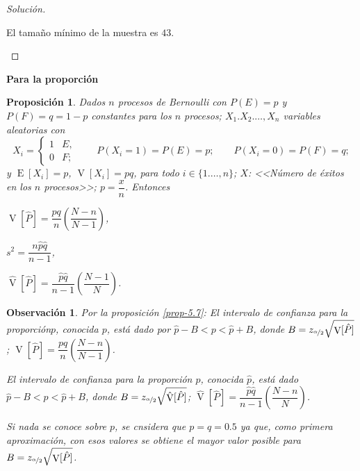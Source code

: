 \documentclass[a5paper,doc,10pt,noapacite]{apa6}
\DeclareMathOperator{\Esp}{E}
\DeclareMathOperator{\Var}{V}
\newtheorem{proposicion}{Proposición}
\newtheorem{observ}{Observación}
\newcommand{\neodefi}[1]{%
	\vspace{1\baselineskip}
	\textbf{\small#1} \newline
}
\begin{document}
{{\begin{proof}[Solución]
\begin{APAenumerate}
	
	El tamaño mínimo de la muestra es \(43\).			\qedhere
	\end{APAenumerate}
\end{proof}


\neodefi{Para la proporción}


\begin{proposicion}\label{prop-5.7}
	Dados \(n\) procesos de Bernoulli con \(P(E)=p\) y \(P(F)=q=1-p\) constantes para los \(n\) procesos; \(X_1.X_2.\ldots,X_n\) variables aleatorias con
	\[
	X_i=\begin{cases} 1 & E,\\ 0 & F;\end{cases}
	\qquad
	P(X_i=1)=P(E)=p;
	\qquad
	P(X_i=0)=P(F)=q;
\]
y \(\Esp[X_i]=p\), \(\Var[X_i]=pq\), para todo \(i \in \{1.\ldots,n\}\); \(X\): <<Número de éxitos en los \(n\) procesos>>; \(p=\dfrac{x}{n}\). Entonces
	\begin{APAenumerate}
		\item \(\Var[\hat{P}]=\dfrac{pq}{n}\left(\dfrac{N-n}{N-1}\right)\),
		\item \(s^2=\dfrac{n\hat{p}\hat{q}}{n-1}\),
		\item \(\hat{\Var}[\hat{P}]=\dfrac{\hat{p}\hat{q}}{n-1}\left(\dfrac{N-1}{N}\right)\).
	\end{APAenumerate}
\end{proposicion}

\begin{observ}
	Por la proposición \eqref{prop-5.7}: El intervalo de confianza para la proporción\(p\), conocida \(p\), está dado por \(\hat{p}-B<p<\hat{p}+B\), donde \(B=z_{\nicefrac{\alpha}{2}}\sqrt{\Var[\hat{P}]}\); \(\Var[\hat{P}]=\dfrac{pq}{n}\left(\dfrac{N-n}{N-1}\right)\).
	
	El intervalo de confianza para la proporción \(p\), conocida \(\hat{p}\), está dado \(\hat{p}-B<p<\hat{p}+B\), donde \(B=z_{\nicefrac{\alpha}{2}}\sqrt{\hat{\Var}[\hat{P}]}\); \(\hat{\Var}[\hat{P}]=\dfrac{\hat{p}\hat{q}}{n-1}\left(\dfrac{N-n}{N}\right)\).
	
	Si nada se conoce sobre \(p\), se cnsidera que \(p=q=0.5\) ya que, como primera aproximación, con esos valores se obtiene el mayor valor posible para \(B=z_{\nicefrac{\alpha}{2}}\sqrt{\Var[\hat{P}]}\).
\end{observ}



}}
\end{document}
